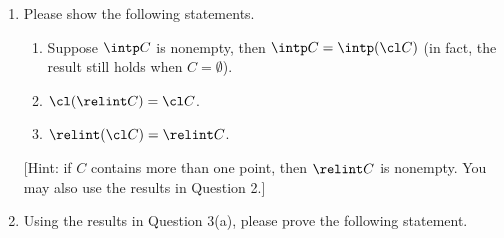 \begin{exercise}
\begin{enumerate}
\begin{enumerate}
        \item Please show the following statements.
          \begin{enumerate}
            \item Suppose $\intp C$ is nonempty, then $\intp C=\intp(\cl C)$ (in fact, the result still holds when $C=\emptyset$).
            \item $\cl (\relint C)=\cl C$.
            \item $\relint (\cl C)=\relint C$.
          \end{enumerate}
          [Hint: if $C$ contains more than one point, then $\relint C$ is nonempty. You may also use the results in Question 2.]

        \item Using the results in Question 3(a), please prove the following statement.


\end{enumerate}
\end{enumerate}
\end{exercise}
